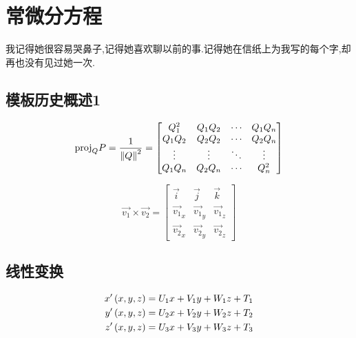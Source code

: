 \chapter{常微分方程}
\begin{center}
    \textcolor[RGB]{255, 0, 0}{\faHeart}我记得她很容易哭鼻子,记得她喜欢聊以前的事.记得她在信纸上为我写的每个字,却再也没有见过她一次.\textcolor[RGB]{255, 0, 0}{\faHeart}
\end{center}
\vspace{-5pt}
\begin{center}
\end{center}

\section{模板历史概述1}
\[
    \mathrm{proj}_QP=\frac{1}{\left\| Q \right\|^2}=
    \begin{bmatrix}
        Q_1^2  & Q_1Q_2 & \cdots & Q_1Q_n \\
        Q_1Q_2 & Q_2Q_2 & \cdots & Q_2Q_n \\
        \vdots & \vdots & \ddots & \vdots \\
        Q_1Q_n & Q_2Q_n & \cdots & Q_n^2  \\
    \end{bmatrix}
\]

\[
    \overrightarrow{v_1} \times \overrightarrow{v_2} = \begin{bmatrix}
        \vec{i}                & \vec{j}                & \vec{k}                \\
        \overrightarrow{v_1}_x & \overrightarrow{v_1}_y & \overrightarrow{v_1}_z \\
        \overrightarrow{v_2}_x & \overrightarrow{v_2}_y & \overrightarrow{v_2}_z
    \end{bmatrix}
\]

\section{线性变换}

\begin{align*}
    x'\left(x,y,z\right) & = U_1x+V_1y+W_1z+T_1 \\
    y'\left(x,y,z\right) & = U_2x+V_2y+W_2z+T_2 \\
    z'\left(x,y,z\right) & = U_3x+V_3y+W_3z+T_3
\end{align*}

